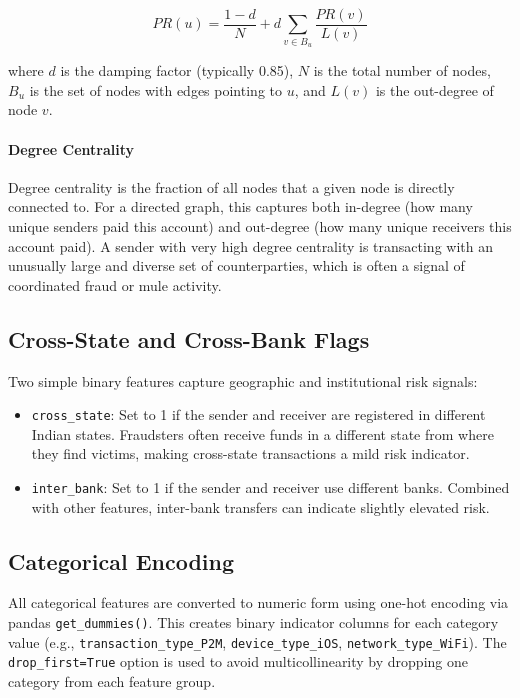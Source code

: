 \begin{equation}
PR(u) = \frac{1-d}{N} + d \sum_{v \in B_u} \frac{PR(v)}{L(v)}
\end{equation}

where $d$ is the damping factor (typically 0.85), $N$ is the total number of nodes, $B_u$ is the set of nodes with edges pointing to $u$, and $L(v)$ is the out-degree of node $v$.

\paragraph{Degree Centrality} Degree centrality is the fraction of all nodes that a given node is directly connected to. For a directed graph, this captures both in-degree (how many unique senders paid this account) and out-degree (how many unique receivers this account paid). A sender with very high degree centrality is transacting with an unusually large and diverse set of counterparties, which is often a signal of coordinated fraud or mule activity.

\subsection{Cross-State and Cross-Bank Flags}

Two simple binary features capture geographic and institutional risk signals:

\begin{itemize}
    \item \texttt{cross\_state}: Set to 1 if the sender and receiver are registered in different Indian states. Fraudsters often receive funds in a different state from where they find victims, making cross-state transactions a mild risk indicator.
    \item \texttt{inter\_bank}: Set to 1 if the sender and receiver use different banks. Combined with other features, inter-bank transfers can indicate slightly elevated risk.
\end{itemize}

\subsection{Categorical Encoding}

All categorical features are converted to numeric form using one-hot encoding via pandas \texttt{get\_dummies()}. This creates binary indicator columns for each category value (e.g., \texttt{transaction\_type\_P2M}, \texttt{device\_type\_iOS}, \texttt{network\_type\_WiFi}). The \texttt{drop\_first=True} option is used to avoid multicollinearity by dropping one category from each feature group.

